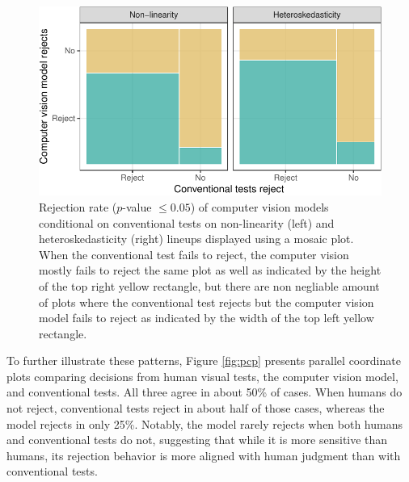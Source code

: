 \documentclass[]{interact}
\theoremstyle{plain}%
\theoremstyle{definition}
\theoremstyle{remark}
\begin{document}
\begin{figure}[!h]

{\centering \includegraphics[width=1\linewidth]{paper_files/figure-latex/conv-mosaic-1} 

}

\caption{Rejection rate ($p$-value $\leq0.05$) of computer vision models conditional on conventional tests on non-linearity (left) and heteroskedasticity (right) lineups displayed using a mosaic plot. When the conventional test fails to reject, the computer vision mostly fails to reject the same plot as well as indicated by the height of the top right yellow rectangle, but there are non negliable amount of plots where the conventional test rejects but the computer vision model fails to reject as indicated by the width of the top left yellow rectangle.}\label{fig:conv-mosaic}
\end{figure}

To further illustrate these patterns, Figure \ref{fig:pcp} presents
parallel coordinate plots comparing decisions from human visual tests,
the computer vision model, and conventional tests. All three agree in
about 50\% of cases. When humans do not reject, conventional tests
reject in about half of those cases, whereas the model rejects in only
25\%. Notably, the model rarely rejects when both humans and
conventional tests do not, suggesting that while it is more sensitive
than humans, its rejection behavior is more aligned with human judgment
than with conventional tests.
\end{document}
